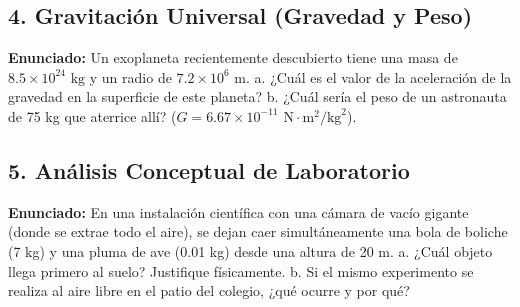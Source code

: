 \documentclass[12pt, letterpaper]{article}
\begin{document}
	
	\subsection*{4. Gravitación Universal (Gravedad y Peso)}
	\noindent \textbf{Enunciado:} Un exoplaneta recientemente descubierto tiene una masa de $8.5 \times 10^{24} \text{ kg}$ y un radio de $7.2 \times 10^6 \text{ m}$. a. ¿Cuál es el valor de la aceleración de la gravedad en la superficie de este planeta? b. ¿Cuál sería el peso de un astronauta de 75 kg que aterrice allí? ($G = 6.67 \times 10^{-11} \text{ N}\cdot\text{m}^2/\text{kg}^2$).
	
	
	\subsection*{5. Análisis Conceptual de Laboratorio}
	\noindent \textbf{Enunciado:} En una instalación científica con una cámara de vacío gigante (donde se extrae todo el aire), se dejan caer simultáneamente una bola de boliche (7 kg) y una pluma de ave (0.01 kg) desde una altura de 20 m. a. ¿Cuál objeto llega primero al suelo? Justifique físicamente. b. Si el mismo experimento se realiza al aire libre en el patio del colegio, ¿qué ocurre y por qué?
	
\end{document}

